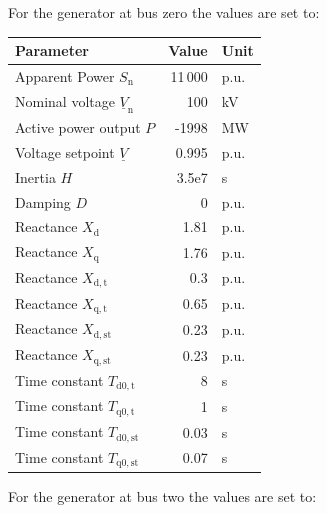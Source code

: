 \vspace*{1cm}

For the generator at bus zero the values are set to:

\begin{tabularx}{\textwidth}{Xrl}
    \textbf{Parameter} & \textbf{Value} & \textbf{Unit} \\ \hline
    \toprule
    Apparent Power $S_\mathrm{n}$ & 11\,000 & p.u. \\
    Nominal voltage $\underline{V}_\mathrm{n}$ & 100 & kV \\
    Active power output $P$ & -1998 & MW \\
    Voltage setpoint $\underline{V}$ & 0.995 & p.u. \\
    Inertia $H$ & 3.5e7 & s \\
    Damping $D$ & 0 & p.u. \\
    Reactance $X_\mathrm{d}$ & 1.81 & p.u. \\
    Reactance $X_\mathrm{q}$ & 1.76 & p.u. \\
    Reactance $X_\mathrm{d,t}$ & 0.3 & p.u. \\
    Reactance $X_\mathrm{q,t}$ & 0.65 & p.u. \\
    Reactance $X_\mathrm{d,st}$ & 0.23 & p.u. \\
    Reactance $X_\mathrm{q,st}$ & 0.23 & p.u. \\
    Time constant $T_\mathrm{d0,t}$ & 8 & s \\
    Time constant $T_\mathrm{q0,t}$ & 1 & s \\
    Time constant $T_\mathrm{d0,st}$ & 0.03 & s \\
    Time constant $T_\mathrm{q0,st}$ & 0.07 & s \\
    \bottomrule
\end{tabularx}

\vspace*{1cm}

For the generator at bus two the values are set to:

